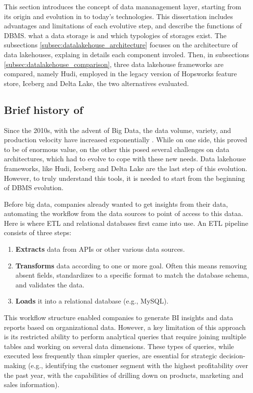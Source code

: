This section introduces the concept of data mananagement layer, starting from its origin and evolution in to today's technologies. This dissertation includes advantages and limitations of each evolutive step, and describe the functions of \gls{DBMS}. what a data storage is and which typologies of storages exist. The subsections \ref{subsec:datalakehouse_architecture} focuses on the architecture of data lakehouses, explaing in details each component involed. Then, in subsections \ref{subsec:datalakehouse_comparison}, three data lakehouse frameworks are compared, namely Hudi, employed in the legacy version of Hopsworks feature store, Iceberg and Delta Lake, the two alternatives evaluated.

\subsection{Brief history of }
\label{subsec:history_DBMS}
Since the 2010s, with the advent of Big Data, the data volume, variety, and production velocity have increased exponentially \cite{ederUnstructuredData802008, penceWhatBigData2014}. While on one side, this proved to be of enormous value, on the other this posed several challenges \cite{demchenkoAddressingBigData2012} on data architectures, which had to evolve to cope with these new needs. Data lakehouse frameworks, like Hudi, Iceberg and Delta Lake \cite{rajaperumalUberEngineeringIncremental2017,IcebergExamples2024,armbrustDeltaLakeHighperformance2020} are the last step of this evolution. However, to truly understand this tools, it is needed to start from the beginning of \gls{DBMS} evolution.

\smallskip

Before big data, companies already wanted to get insights from their data, automating the workflow from the data sources to point of access to this dataa. Here is where \gls{ETL} and relational databases first came into use. An \gls{ETL} pipeline consists of three steps:
\begin{enumerate}
    \item \textbf{Extracts} data from \glspl{API} or other various data sources.
    \item \textbf{Transforms} data according to one or more goal. Often this means removing absent fields, standardizes to a specific format to match the database schema, and validates the data.
    \item \textbf{Loads} it into a relational database (e.g., MySQL).
\end{enumerate}
This workflow structure enabled companies to generate \gls{BI} insights and data reports based on organizational data. However, a key limitation of this approach is its restricted ability to perform analytical queries that require joining multiple tables and working on several data dimensions. These types of queries, while executed less frequently than simpler queries, are essential for strategic decision-making (e.g., identifying the customer segment with the highest profitability over the past year, with the capabilities of drilling down on products, marketing and sales information).

